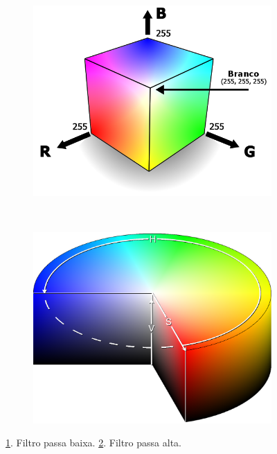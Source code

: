 \documentclass[
	article,			%
	11pt,				%
	oneside,			%
	a4paper,			%
	english,			%
	brazil,				%
	sumario=tradicional
	]{abntex2}
\begin{document}
\begin{figure}
		\centering
        \begin{subfigure}[b]{0.3\textwidth}
                \includegraphics[width=\textwidth,scale=1]{imagens/ex4/rgbColorspace.png}
                \caption{}
                \label{fig:passaBaixa}
        \end{subfigure}%
        ~ %
        \begin{subfigure}[b]{0.3\textwidth}
                \includegraphics[width=\textwidth,scale=1]{imagens/ex4/HSVColorSpace.png}
                \caption{}
                \label{fig:passaAlta}
        \end{subfigure}
       
        \caption{ 
        \ref{fig:passaBaixa}. Filtro passa baixa.
        \ref{fig:passaAlta}. Filtro passa alta.
        }
	\label{fig:filtrosFrequencia}
\end{figure}
\end{document}
